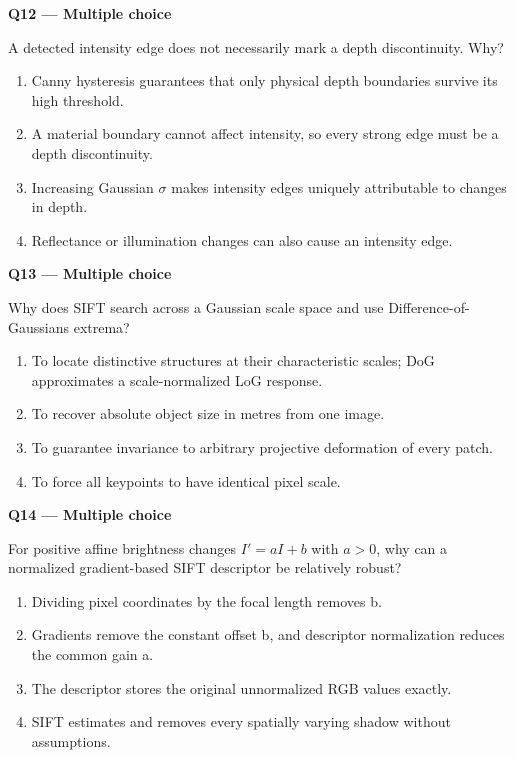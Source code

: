 \documentclass[11pt,a4paper]{article}
\begin{document}
\par\vspace{12pt}
\begin{minipage}{\linewidth}
\textbf{Q12 — Multiple choice}\par\smallskip
A detected intensity edge does not necessarily mark a depth discontinuity. Why?
\begin{enumerate}[label=\textbf{\Alph*.}]
\item Canny hysteresis guarantees that only physical depth boundaries survive its high threshold.
\item A material boundary cannot affect intensity,\allowbreak{} so every strong edge must be a depth discontinuity.
\item Increasing Gaussian \(\sigma\) makes intensity edges uniquely attributable to changes in depth.
\item Reflectance or illumination changes can also cause an intensity edge.
\end{enumerate}
\end{minipage}
\par\vspace{12pt}
\begin{minipage}{\linewidth}
\textbf{Q13 — Multiple choice}\par\smallskip
Why does SIFT search across a Gaussian scale space and use Difference-of-Gaussians extrema?
\begin{enumerate}[label=\textbf{\Alph*.}]
\item To locate distinctive structures at their characteristic scales; DoG approximates a scale-normalized LoG response.
\item To recover absolute object size in metres from one image.
\item To guarantee invariance to arbitrary projective deformation of every patch.
\item To force all keypoints to have identical pixel scale.
\end{enumerate}
\end{minipage}
\par\vspace{12pt}
\begin{minipage}{\linewidth}
\textbf{Q14 — Multiple choice}\par\smallskip
For positive affine brightness changes \(I'=aI+b\) with \(a>0\),\allowbreak{} why can a normalized gradient-based SIFT descriptor be relatively robust?
\begin{enumerate}[label=\textbf{\Alph*.}]
\item Dividing pixel coordinates by the focal length removes b.
\item Gradients remove the constant offset b,\allowbreak{} and descriptor normalization reduces the common gain a.
\item The descriptor stores the original unnormalized RGB values exactly.
\item SIFT estimates and removes every spatially varying shadow without assumptions.
\end{enumerate}
\end{minipage}
\end{document}
